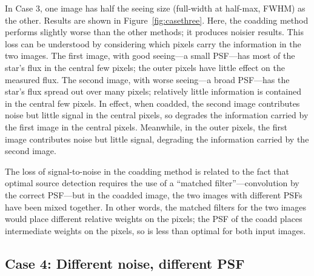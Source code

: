 \documentclass[a4paper,11pt]{article}
\begin{document}
In Case 3, one image has half the seeing size (full-width at half-max,
FWHM) as the other.  Results are shown in Figure~\ref{fig:casethree}.
Here, the coadding method performs slightly worse than the other
methods; it produces noisier results.
%
This loss can be understood by considering which pixels carry the
information in the two images.  The first image, with good seeing---a
small PSF---has most of the star's flux in the central few pixels; the
outer pixels have little effect on the measured flux.  The second
image, with worse seeing---a broad PSF---has the star's flux spread
out over many pixels; relatively little information is contained in
the central few pixels.  In effect, when coadded, the second image
contributes noise but little signal in the central pixels, so degrades
the information carried by the first image in the central pixels.
Meanwhile, in the outer pixels, the first image contributes noise but
little signal, degrading the information carried by the second image.


The loss of signal-to-noise in the coadding method is related to the
fact that optimal source detection requires the use of a ``matched
filter''---convolution by the correct PSF---but in the coadded image,
the two images with different PSFs have been mixed together.  In other
words, the matched filters for the two images would place different
relative weights on the pixels; the PSF of the coadd places
intermediate weights on the pixels, so is less than optimal for both
input images.

\newpage

\subsection*{Case 4: Different noise, different PSF}
\end{document}
